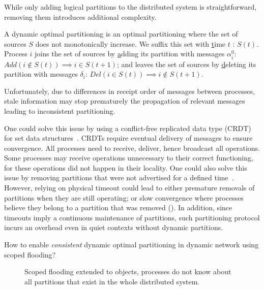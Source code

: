 While only adding logical partitions to the distributed system is
straightforward, removing them introduces additional complexity. 

\begin{definition}
  A dynamic optimal partitioning is an optimal partitioning where the
  set of sources $S$ does not monotonically increase. We suffix this
  set with \underline{t}ime $t$ : $S(t)$.  Process $i$ joins the set
  of sources by \underline{a}dding its partition with messages
  $\alpha_i^{0}$: $Add(i \not\in S(t)) \implies i \in S(t+1)$; and
  leaves the set of sources by \underline{d}eleting its partition with
  messages $\delta_i$: $Del(i \in S(t)) \implies i \not\in S(t+1)$.
\end{definition}

Unfortunately, due to differences in receipt order of messages between
processes, stale information may stop prematurely the propagation of
relevant messages leading to inconsistent partitioning.

One could solve this issue by using a conflict-free replicated data
type (CRDT) for set data structures~\cite{shapiro2011crdts}. CRDTs
require eventual delivery of messages to ensure convergence. All
processes need to receive, deliver, hence broadcast all
operations. Some processes may receive operations unnecessary to their
correct functioning, for these operations did not happen in their
locality.  One could also solve this issue by removing partitions that
were not advertised for a defined
time~\cite{hemmati2015namebased}.  However, relying on physical timeout could lead to
either premature removals of partitions when they are still operating;
or slow convergence where processes believe they belong to a partition
that was removed (). In addition, since timeouts imply a
continuous maintenance of partitions, such partitioning protocol
incurs an overhead even in quiet contexts without dynamic partitions.

\begin{problem}
  How to enable \emph{consistent} dynamic optimal partitioning in
  dynamic network using scoped flooding?
\end{problem}


\begin{figure}
  \begin{center}
    
    \caption{\label{fig:ASmotivation}Scoped flooding extended to
      objects, processes do not know about all partitions that exist
      in the whole distributed system.}
  \end{center}
\end{figure}

